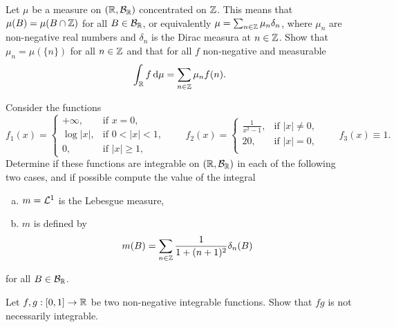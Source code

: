 \begin{problem} Let $\mu$ be a measure on $(\mathbb R,\mathcal B_{\mathbb R})$ concentrated on $\mathbb Z$. This means that $\mu(B) = \mu(B\cap \mathbb Z)$ for all $B\in \mathcal B_{\mathbb R}$, or equivalently 
$\mu = \sum_{n\in \mathbb Z}\mu_n \delta_n$, where $\mu_n$ are non-negative real numbers and $\delta_n$ is the Dirac measura at $n\in \mathbb Z$. Show that $\mu_n = \mu(\{n\})$ for all $n\in \mathbb Z$ and that  for all $f$ non-negative and measurable
\begin{equation*}
    \int_{\mathbb R} f\,\mathrm{d} \mu = \sum_{n\in \mathbb Z} \mu_n f(n).
\end{equation*}
\end{problem}

\begin{problem}Consider the functions
    \begin{equation*}
        f_1(x) = \begin{cases}
            +\infty, & \text{if } x=0,\\
            \log|x|, & \text{if } 0<|x|<1,\\
            0, & \text{if }|x|\geq 1,
        \end{cases}
        \qquad 
        f_2(x) = \begin{cases}
            \frac{1}{x^2-1}, & \text{if } |x|\neq 0,\\
            20, & \text{if } |x| = 0,\\
        \end{cases}
        \qquad f_3(x)\equiv 1.
    \end{equation*}
    Determine if these functions are integrable on $(\mathbb R,\mathcal B_{\mathbb R})$ in each of the following two cases, and if possible compute the value of the integral
    \begin{enumerate}[a)]
        \item $m =\mathcal L^1$ is the Lebesgue measure,
        \item $m$ is defined by
        \begin{equation*}
            m(B) = \sum_{n\in \mathbb Z} \frac{1}{1+(n+1)^2} \delta_n(B)
        \end{equation*}
    \end{enumerate}
    for all $B\in \mathcal B_{\mathbb R}$.
\end{problem}

\begin{problem} Let $f,g: [0,1]\to\mathbb R$ be two non-negative integrable functions. Show that $fg$ is not necessarily integrable.
\end{problem}

